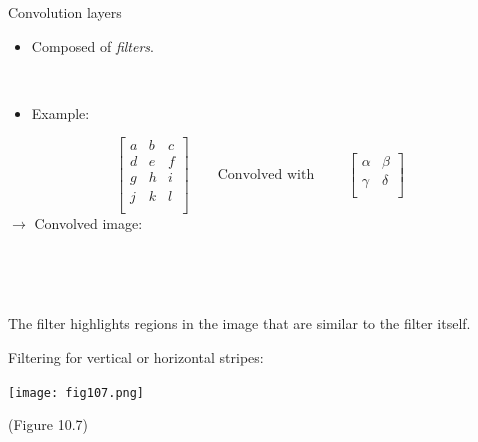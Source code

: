 \documentclass[
  10pt,
  ignorenonframetext,
]{beamer}
\providecommand{\tightlist}{%
  \setlength{\itemsep}{0pt}\setlength{\parskip}{0pt}}
\begin{document}
\begin{frame}
\begin{block}{Convolution layers}
\protect\hypertarget{convolution-layers}{}
\(~\)

\begin{itemize}
\tightlist
\item
  Composed of \emph{filters}.
\end{itemize}

\(~\)

\begin{itemize}
\tightlist
\item
  Example:
\end{itemize}

\[\left[ 
\begin{matrix}
a & b & c \\
d & e & f \\
g & h & i\\
j & k & l \\
\end{matrix}
\right] \qquad \text{Convolved with } \qquad 
\left[ 
\begin{matrix}
\alpha & \beta \\
\gamma & \delta \\
\end{matrix}\right] \] \(\rightarrow\) Convolved image:

\(~\)

\vspace{2cm}

\(~\)

The filter highlights regions in the image that are similar to the
filter itself.
\end{block}
\end{frame}

\begin{frame}
Filtering for vertical or horizontal stripes:

\centering

\texttt{[image: fig107.png]}

\scriptsize

(Figure 10.7)
\end{frame}
\end{document}
